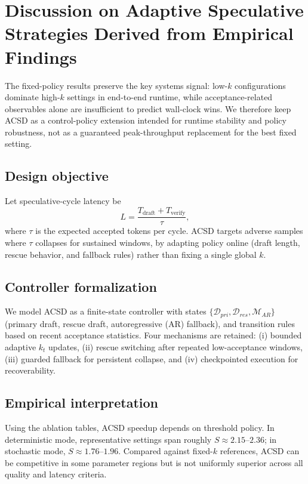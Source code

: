 \section{Discussion on Adaptive Speculative Strategies Derived from Empirical Findings}
\label{sec:acsd}

The fixed-policy results preserve the key systems signal:
low-$k$ configurations dominate high-$k$ settings in end-to-end runtime,
while acceptance-related observables alone are insufficient to predict wall-clock
wins. We therefore keep ACSD as a control-policy extension intended for runtime
stability and policy robustness, not as a guaranteed peak-throughput replacement
for the best fixed setting.

\subsection{Design objective}

Let speculative-cycle latency be
\begin{equation}
  L = \frac{T_{\text{draft}} + T_{\text{verify}}}{\tau},
\end{equation}
where $\tau$ is the expected accepted tokens per cycle.
ACSD targets adverse samples where $\tau$ collapses for sustained windows,
by adapting policy online (draft length, rescue behavior, and fallback rules)
rather than fixing a single global $k$.

\subsection{Controller formalization}

We model ACSD as a finite-state controller with states
$\{\mathcal{D}_{pri},\mathcal{D}_{res},\mathcal{M}_{AR}\}$
(primary draft, rescue draft, autoregressive (AR) fallback), and transition rules
based on recent acceptance statistics.
Four mechanisms are retained:
(i) bounded adaptive $k_t$ updates,
(ii) rescue switching after repeated low-acceptance windows,
(iii) guarded fallback for persistent collapse,
and (iv) checkpointed execution for recoverability.

\subsection{Empirical interpretation}

Using the ablation tables, ACSD speedup depends on threshold policy.
In deterministic mode, representative settings span roughly
$S\approx2.15$--$2.36$; in stochastic mode,
$S\approx1.76$--$1.96$.
Compared against fixed-$k$ references, ACSD can be competitive in some
parameter regions but is not uniformly superior across all quality and
latency criteria.

